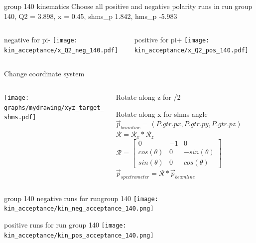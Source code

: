 \documentclass[aspectratio=169,xcolor=dvipsnames]{beamer}
\begin{document}
\begin{frame}{group 140 kinematics}
  Choose all positive and negative polarity runs in run group 140, Q2 = 3.898, x = 0.45, shms_p 1.842, hms_p -5.983
  \begin{columns}
    \begin{column}[T]{0.5\textwidth}
      negative for pi-
      \texttt{[image: kin\_acceptance/x\_Q2\_neg\_140.pdf]}
  \end{column}
  \begin{column}[T]{0.5\textwidth}
    positive for pi+
    \texttt{[image: kin\_acceptance/x\_Q2\_pos\_140.pdf]}
  \end{column}
\end{columns}
\end{frame}

\begin{frame}{Change coordinate system}
  \begin{columns}
    \begin{column}[T]{0.5\textwidth}
  \texttt{[image: graphs/mydrawing/xyz\_target\_shms.pdf]}
\end{column}
\begin{column}[T]{0.5\textwidth}
  Rotate along z for \pi /2
  
  Rotate along x for shms angle
    $\vec{p}_{beamline} = (P.gtr.px,P.gtr.py,P.gtr.pz)$
    \\
    $\mathcal{R} = \mathcal{R}_x *\mathcal{R}_z$
    \\
   $ \mathcal{R} = 
    \begin{bmatrix}
      0 & -1 & 0 \\
      cos(\theta) & 0 & -sin(\theta) \\
      sin(\theta) & 0 & cos(\theta)
    \end{bmatrix}
 $
    \\
    $\vec{p}_{spectrometer} = \mathcal{R}*\vec{p}_{beamline}$
\end{column}
\end{columns}
\end{frame}

\begin{frame}{group 140}
  negative runs for rungroup 140
  \texttt{[image: kin\_acceptance/kin\_neg\_acceptance\_140.png]}
\end{frame}

\begin{frame}
  positive runs for run group 140
  \texttt{[image: kin\_acceptance/kin\_pos\_acceptance\_140.png]}
\end{frame}
\end{document}
